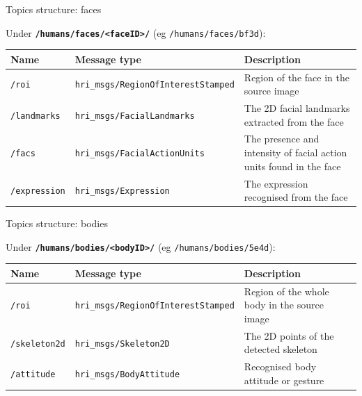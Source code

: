 \documentclass[xcolor=table]{beamer}
\begin{document}
\begin{frame}{Topics structure: faces}

    Under \textbf{\texttt{/humans/faces/<faceID>/}} (eg \texttt{/humans/faces/bf3d}):

    \scriptsize
    \begin{tabular}{@{}llp{4cm}@{}}
        \toprule
\textbf{Name} & \textbf{Message type}         & \textbf{Description}                                                \\ \midrule
        \texttt{/roi       }   & \texttt{hri\_msgs/RegionOfInterestStamped} & Region of the face in the source image                              \\
        \texttt{/landmarks }   & \texttt{hri\_msgs/FacialLandmarks    } & The 2D facial landmarks extracted from the face                     \\
        \texttt{/facs      }   & \texttt{hri\_msgs/FacialActionUnits  } & The presence and intensity of facial action units found in the face \\
        \texttt{/expression}   & \texttt{hri\_msgs/Expression         } & The expression recognised from the face           \\  \bottomrule               
\end{tabular}
    
\end{frame}

\begin{frame}{Topics structure: bodies}

    Under \textbf{\texttt{/humans/bodies/<bodyID>/}} (eg \texttt{/humans/bodies/5e4d}):

    \scriptsize
    \begin{tabular}{@{}llp{4cm}@{}}
        \toprule
        \textbf{Name} & \textbf{Message type}         & \textbf{Description}                                                \\ \midrule
        \texttt{/roi       }   & \texttt{hri\_msgs/RegionOfInterestStamped} & Region of the whole body in the source image                              \\
        \texttt{/skeleton2d}   & \texttt{hri\_msgs/Skeleton2D}        & The 2D points of the detected skeleton                              \\
        \texttt{/attitude}    & \texttt{hri\_msgs/BodyAttitude}      & Recognised body attitude or gesture                                 \\
        \bottomrule               
\end{tabular}
    
\end{frame}
\end{document}
